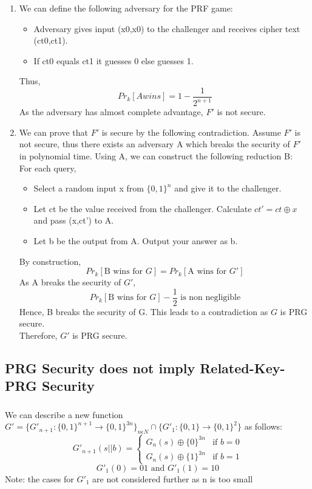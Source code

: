 \documentclass{article}
\begin{document}
\subsubsection{}
\begin{enumerate}[label=\roman*.]
    \item We can define the following adversary for the PRF game:
    \begin{itemize}
        \item Adversary gives input (x0,x0) to the challenger and receives cipher text (ct0,ct1).
        \item If ct0 equals ct1 it guesses 0 else guesses 1.
    \end{itemize}
    Thus,
    \[Pr_{k}[A wins]= 1 - \frac{1}{2^{n+1}}\]
    As the adversary has almost complete advantage, $F'$ is not secure.
    \item We can prove that $F'$ is secure by the following contradiction.
    Assume $F'$ is not secure, thus there exists an adversary A which breaks the security of $F'$ in polynomial time.
    Using A, we can construct the following reduction B:\\
    For each query,
    \begin{itemize}
        \item Select a random input x from $\{0,1\}^n$ and give it to the challenger.
        \item Let ct be the value received from the challenger. Calculate $ct'= ct \oplus x$ and pass (x,ct') to A.
        \item Let b be the output from A. Output your answer as b.
    \end{itemize}
    By construction,
    \[Pr_{k}[\text{B wins for }G]=Pr_{k}[\text{A wins for }G']\]
    As A breaks the security of $G'$,
    \[Pr_{k}[\text{B wins for }G]- \frac{1}{2}\text{ is non negligible}\]
    Hence, B breaks the security of G.
    This leads to a contradiction as $G$ is PRG secure.\\
    Therefore, $G'$ is PRG secure.
\end{enumerate}
\newpage
\subsection{PRG Security does not imply Related-Key-PRG Security}
\subsubsection{}
We can describe a new function $G'=\{G'_{n+1}: \{0,1\}^{n+1}\rightarrow\{0,1\}^{3n}\}_{n\epsilon N}\cap\{G'_{1}:\{0,1\}\rightarrow \{0,1\}^{2}\}$ as follows:
\[G'_{n+1}(s||b)= \begin{cases}
    G_{n}(s)\oplus\{0\}^{3n} & \text{if } b = 0 \\
    G_{n}(s)\oplus\{1\}^{3n} & \text{if } b = 1
    \end{cases}\]
    \[G'_{1}(0)=01 \text{ and } G'_{1}(1)=10\]
{\tiny Note: the cases for $G'_{1}$ are not considered further as n is too small}
\end{document}
